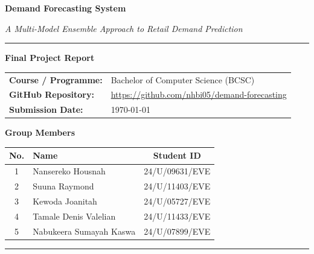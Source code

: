 \documentclass[12pt, a4paper]{article}
\begin{document}
\begin{titlepage}
    \centering
    \vspace*{1.5cm}

    {\Huge\bfseries Demand Forecasting System\par}
    \vspace{0.4cm}
    {\large\itshape A Multi-Model Ensemble Approach to Retail Demand Prediction\par}

    \vspace{1.5cm}
    \rule{\textwidth}{1pt}
    \vspace{1cm}

    {\large\bfseries Final Project Report\par}

    \vspace{2cm}

    \begin{tabular}{@{}ll@{}}
        \textbf{Course / Programme:} & Bachelor of Computer Science (BCSC) \\[0.3cm]
        \textbf{GitHub Repository:}  & \url{https://github.com/nhbi05/demand-forecasting} \\[0.3cm]
        \textbf{Submission Date:}    & \today \\
    \end{tabular}

    \vspace{0.8cm}
    {\normalsize\bfseries Group Members\par}
    \vspace{0.3cm}

    \renewcommand{\arraystretch}{1.3}
    \begin{tabular}{@{}clc@{}}
        \toprule
        \textbf{No.} & \textbf{Name} & \textbf{Student ID} \\
        \midrule
        1 & Nansereko Housnah       & 24/U/09631/EVE \\
        2 & Suuna Raymond           & 24/U/11403/EVE \\
        3 & Kewoda Joanitah         & 24/U/05727/EVE \\
        4 & Tamale Denis Valelian   & 24/U/11433/EVE \\
        5 & Nabukeera Sumayah Kaswa & 24/U/07899/EVE \\
        \bottomrule
    \end{tabular}

    \vfill
    \rule{\textwidth}{0.5pt}
\end{titlepage}
\end{document}
